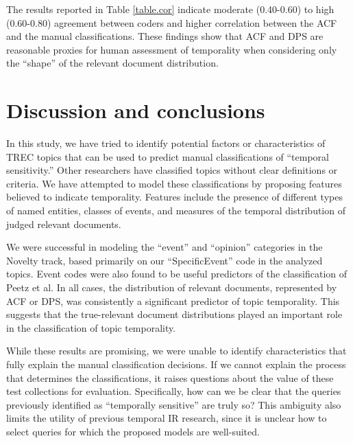 \documentclass{sig-alternate}
\begin{document}
The results reported in Table \ref{table.cor} indicate moderate (0.40-0.60) to high (0.60-0.80) agreement between coders and higher correlation between the ACF and the manual classifications. These findings show that ACF and DPS are reasonable proxies for human assessment of temporality when considering only the ``shape'' of the relevant document distribution.



\section{Discussion and conclusions}

In this study, we have tried to identify potential factors or characteristics of TREC topics that can be used to predict manual classifications of ``temporal sensitivity.'' Other researchers have classified topics without clear definitions or criteria. We have attempted to model these classifications by proposing features believed to indicate temporality.  Features include the presence of different types of named entities, classes of events, and measures of the temporal distribution of judged relevant documents.

We were successful in modeling the ``event'' and ``opinion'' categories in the Novelty track, based primarily on our ``SpecificEvent'' code in the analyzed topics.  Event codes were also found to be useful predictors of the classification of Peetz et al. In all cases, the distribution of relevant documents, represented by ACF or DPS, was consistently a significant predictor of topic temporality. This suggests that the true-relevant document distributions played an important role in the classification of topic temporality.

While these results are promising, we were unable to identify characteristics that fully explain the manual classification decisions. If we cannot explain the process that determines the classifications, it raises questions about the value of these test collections for evaluation. Specifically, how can we be clear that the queries previously identified as ``temporally sensitive'' are truly so? This ambiguity also limits the utility of previous temporal IR research, since it is unclear how to select queries for which the proposed models are well-suited.
\end{document}
